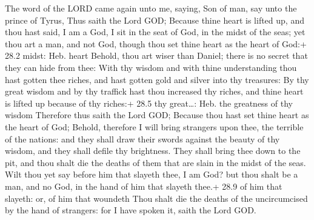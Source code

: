  The word of the LORD came again unto me, saying,
 Son of man, say unto the prince of Tyrus, Thus saith the
Lord GOD; Because thine heart is lifted up, and thou hast said, I am a
God, I sit in the seat of God, in the midst of the seas; yet thou art a
man, and not God, though thou set thine heart as the heart of God:+ 28.2
midst: Heb. heart  Behold, thou art wiser than Daniel; there
is no secret that they can hide from thee:  With thy wisdom
and with thine understanding thou hast gotten thee riches, and hast
gotten gold and silver into thy treasures:  By thy great
wisdom and by thy traffick hast thou increased thy riches, and thine
heart is lifted up because of thy riches:+ 28.5 thy great\ldots: Heb.
the greatness of thy wisdom  Therefore thus saith the Lord
GOD; Because thou hast set thine heart as the heart of God; 
Behold, therefore I will bring strangers upon thee, the terrible of the
nations: and they shall draw their swords against the beauty of thy
wisdom, and they shall defile thy brightness.  They shall
bring thee down to the pit, and thou shalt die the deaths of them that
are slain in the midst of the seas.  Wilt thou yet say
before him that slayeth thee, I am God? but thou shalt be a man, and no
God, in the hand of him that slayeth thee.+ 28.9 of him that slayeth:
or, of him that woundeth  Thou shalt die the deaths of the
uncircumcised by the hand of strangers: for I have spoken it, saith the
Lord GOD.

